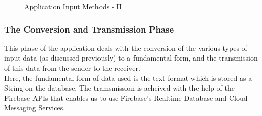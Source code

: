 \documentclass[14pt]{report}
\begin{document}
						\begin{figure}[h]
							\centering
							\qquad
							\caption{Application Input Methods - II}%
							\label{fig:input2}%
						\end{figure}
				\subsubsection{The Conversion and Transmission Phase}
						This phase of the application deals with the conversion of the various types of input data (as discussed previously) to a fundamental form, and the transmission of this data from the sender to the receiver.\\

						Here, the fundamental form of data used is the text format which is stored as a String on the database. The tramsmission is acheived with the help of the Firebase APIs that enables us to use Firebase's Realtime Database and Cloud Messaging Services.\\
\end{document}
